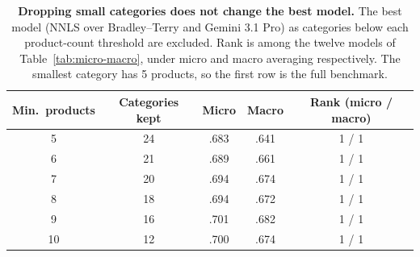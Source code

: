 \begin{table}[t]
\centering
\footnotesize
\setlength{\tabcolsep}{6pt}
\renewcommand{\arraystretch}{0.95}
\caption{\textbf{Dropping small categories does not change the best model.} The best
model (NNLS over Bradley--Terry and Gemini 3.1 Pro) as categories below each
product-count threshold are excluded. Rank is among the twelve models of
Table~\ref{tab:micro-macro}, under micro and macro averaging respectively. The
smallest category has 5 products, so the first row is the full benchmark.}
\label{tab:exclusion-sweep}
\begin{tabular}{@{}ccccc@{}}
\toprule
Min.\ products & Categories kept & Micro & Macro & Rank (micro / macro) \\
\midrule
5 & 24 & .683 & .641 & 1 / 1 \\
6 & 21 & .689 & .661 & 1 / 1 \\
7 & 20 & .694 & .674 & 1 / 1 \\
8 & 18 & .694 & .672 & 1 / 1 \\
9 & 16 & .701 & .682 & 1 / 1 \\
10 & 12 & .700 & .674 & 1 / 1 \\
\bottomrule
\end{tabular}
\end{table}

